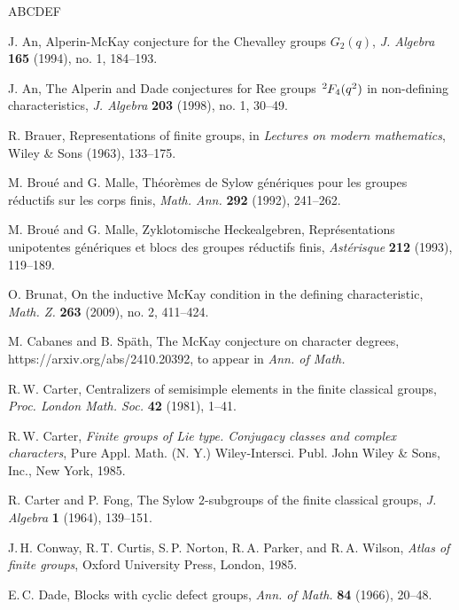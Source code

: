 \documentclass[12pt]{amsart}
\theoremstyle{plain}
\theoremstyle{definition}
\numberwithin{equation}{section}
\newcommand{\ta}{\hspace{0.5mm}^{2}\hspace*{-0.2mm}}
\begin{document}
 \begin{thebibliography}{ABCDEF}

J. An, Alperin-McKay conjecture for the Chevalley groups $G_2(q)$,
\emph{J. Algebra} \textbf{165} (1994), no. 1, 184--193.

J. An, The Alperin and Dade conjectures for Ree groups $\ta
F_4(q^2)$ in non-defining characteristics, \emph{J. Algebra}
\textbf{203} (1998), no. 1, 30--49.

R. Brauer, Representations of finite groups, in {\em Lectures on
modern mathematics}, Wiley \& Sons (1963), 133--175.

M. Brou\'{e} and G. Malle, Th\'{e}or\`{e}mes de Sylow
g\'{e}n\'{e}riques pour les groupes r\'{e}ductifs sur les corps
finis, \emph{Math. Ann.} \textbf{292} (1992), 241--262.

M. Brou\'{e} and G. Malle, Zyklotomische
Heckealgebren,
Repr\'{e}sentations unipotentes g\'{e}n\'{e}riques et blocs des
groupes r\'{e}ductifs finis, \emph{Ast\'{e}risque} \textbf{212}
(1993), 119--189.

O. Brunat, On the inductive McKay condition in the defining
characteristic, \emph{Math. Z.} \textbf{263} (2009), no. 2,
411--424.


M. Cabanes and B. Sp\"ath, The McKay conjecture on character
degrees, https://arxiv.org/abs/2410.20392, to appear in
 {\em Ann. of Math.}

R.\,W. Carter, Centralizers of semisimple elements in the finite
classical groups, \emph{Proc. London Math. Soc.} \textbf{42} (1981),
1--41.

R.\,W. Carter, \emph{Finite groups of Lie type. Conjugacy classes
and complex characters}, Pure Appl. Math. (N. Y.) Wiley-Intersci.
Publ. John Wiley \& Sons, Inc., New York, 1985.

R. Carter and P. Fong, The Sylow $2$-subgroups of the finite
classical groups, \emph{J. Algebra} \textbf{1} (1964), 139--151.



J.\,H. Conway, R.\,T. Curtis, S.\,P. Norton, R.\,A. Parker, and
R.\,A. Wilson, \emph{Atlas of finite groups}, Oxford University
Press, London, 1985.

{\sc E.\,C. Dade}, Blocks with cyclic defect groups, \emph{Ann. of
Math.} \textbf{84} (1966), 20--48.


\end{thebibliography}
\end{document}
